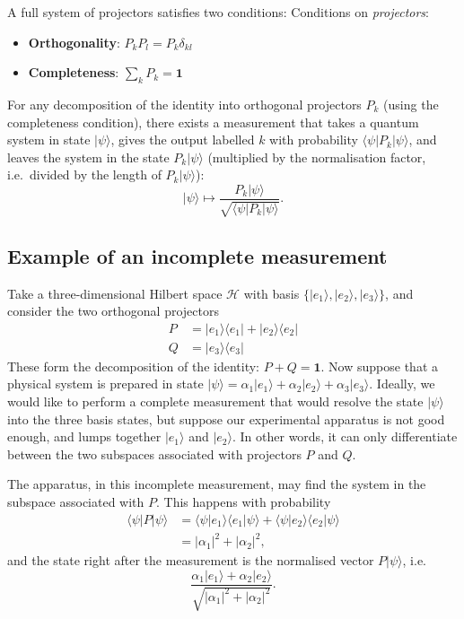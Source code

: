 \documentclass[fleqn]{article}
\providecommand{\tightlist}{%
  \setlength{\itemsep}{0pt}\setlength{\parskip}{0pt}}
\newenvironment{idea}{\noindent}{\medskip}
\begin{document}
\begin{idea}

A full system of projectors satisfies two conditions:
Conditions on \emph{projectors}:

\begin{itemize}
\tightlist
\item
  \textbf{Orthogonality}: \(P_k P_l = P_k\delta_{kl}\)
\item
  \textbf{Completeness}: \(\sum_k P_k = \mathbf{1}\)
\end{itemize}

\end{idea}

For any decomposition of the identity into orthogonal projectors \(P_k\) (using the completeness condition), there exists a measurement that takes a quantum system in state \(|\psi\rangle\), gives the output labelled \(k\) with probability \(\langle\psi|P_k|\psi\rangle\), and leaves the system in the state \(P_k|\psi\rangle\) (multiplied by the normalisation factor, i.e.~divided by the length of \(P_k|\psi\rangle\)):
\[
  |\psi\rangle
  \mapsto
  \frac{P_k|\psi\rangle}{\sqrt{\langle\psi|P_k|\psi\rangle}}.
\]

\hypertarget{example-of-an-incomplete-measurement}{%
\subsection{Example of an incomplete measurement}\label{example-of-an-incomplete-measurement}}

Take a three-dimensional Hilbert space \(\mathcal{H}\) with basis \(\{|e_1\rangle,|e_2\rangle,|e_3\rangle\}\), and consider the two orthogonal projectors
\[
  \begin{aligned}
    P &= |e_1\rangle\langle e_1| + |e_2\rangle\langle e_2|
  \\Q &= |e_3\rangle\langle e_3|
  \end{aligned}
\]
These form the decomposition of the identity: \(P+Q=\mathbf{1}\).
Now suppose that a physical system is prepared in state \(|\psi\rangle = \alpha_1|e_1\rangle + \alpha_2|e_2\rangle + \alpha_3|e_3\rangle\).
Ideally, we would like to perform a complete measurement that would resolve the state \(|\psi\rangle\) into the three basis states, but suppose our experimental apparatus is not good enough, and lumps together \(|e_1\rangle\) and \(|e_2\rangle\).
In other words, it can only differentiate between the two subspaces associated with projectors \(P\) and \(Q\).

The apparatus, in this incomplete measurement, may find the system in the subspace associated with \(P\).
This happens with probability
\[
  \begin{aligned}
    \langle\psi|P|\psi\rangle
    &= \langle\psi|e_1\rangle \langle e_1|\psi\rangle + \langle\psi|e_2\rangle \langle e_2|\psi\rangle
  \\&= |\alpha_1|^2 + |\alpha_2|^2,
  \end{aligned}
\]
and the state right after the measurement is the normalised vector \(P|\psi\rangle\), i.e.
\[
  \frac{\alpha_1|e_1\rangle+\alpha_2|e_2\rangle}{\sqrt{|\alpha_1|^2 + |\alpha_2|^2}}.
\]
\end{document}
